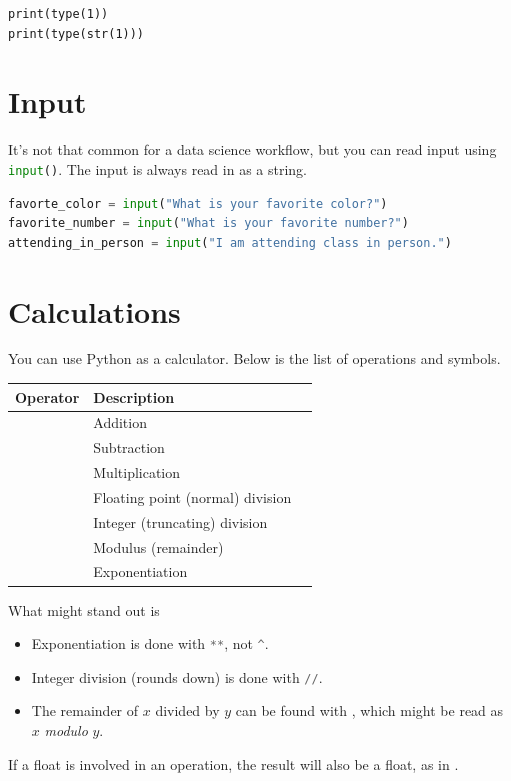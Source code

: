\begin{lstlisting}
print(type(1))
print(type(str(1)))
\end{lstlisting}

\section{Input}

It's not that common for a data science workflow, but you can read input using \lstinline[language = Python]{input()}.
The input is always read in as a string.

\begin{lstlisting}[language = Python]
favorte_color = input("What is your favorite color?")
favorite_number = input("What is your favorite number?")
attending_in_person = input("I am attending class in person.") \end{lstlisting}


\section{Calculations}

You can use Python as a calculator. Below is the list of operations and symbols. 

\begin{center}
{\setlength{\tabcolsep}{2em}
\begin{tabular}{lll}
\toprule
Operator & Description \\
\midrule
\code{+} &    Addition \\
\code{-} & Subtraction \\
\code{*}  &    Multiplication \\
\code{/}  &   Floating point (normal) division \\
\code{//}  &  Integer (truncating) division \\
\code{\%} & Modulus (remainder) \\
\code{**} & Exponentiation \\
\bottomrule
\end{tabular}}
\end{center}


What might stand out is 
\begin{itemize}
\item Exponentiation is done with \lstinline[language = Python]{**}, not \lstinline[language = Python]{^}.
\item Integer division (rounds down) is done with \lstinline[language = Python]{//}.
\item The remainder of $x$ divided by $y$ can be found with , which might be read as
$x$ \emph{modulo} $y$. 
\end{itemize}

If a float is involved in an operation, the result will also be a float, as in .
